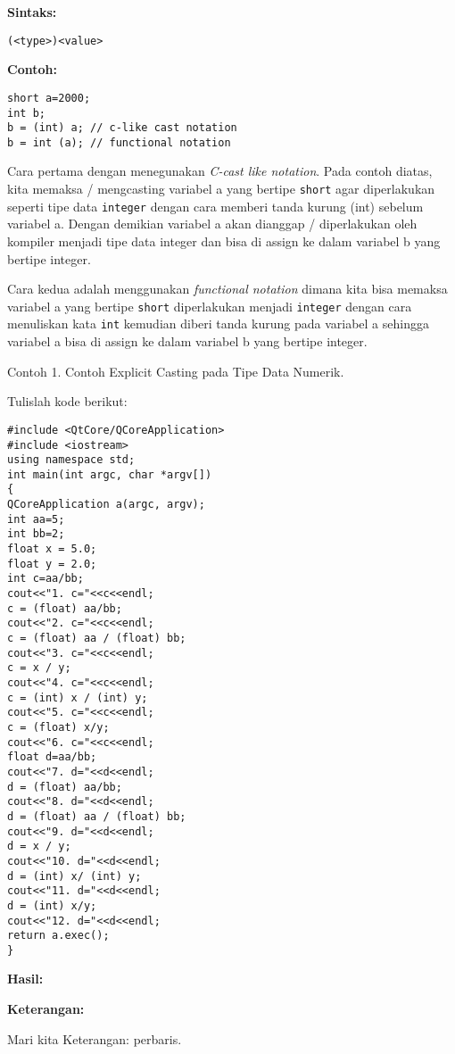 \textbf{Sintaks:}

\begin{verbatim}
(<type>)<value>
\end{verbatim}

\textbf{Contoh:}

\begin{verbatim}
short a=2000;
int b;
b = (int) a; // c-like cast notation
b = int (a); // functional notation
\end{verbatim}

Cara pertama dengan menegunakan \emph{C-cast like notation}. Pada contoh
diatas, kita memaksa / mengcasting variabel a yang bertipe
\texttt{short} agar diperlakukan seperti tipe data \texttt{integer}
dengan cara memberi tanda kurung (int) sebelum variabel a. Dengan
demikian variabel a akan dianggap / diperlakukan oleh kompiler menjadi
tipe data integer dan bisa di assign ke dalam variabel b yang bertipe
integer.

Cara kedua adalah menggunakan \emph{functional notation} dimana kita
bisa memaksa variabel a yang bertipe \texttt{short} diperlakukan menjadi
\texttt{integer} dengan cara menuliskan kata \texttt{int} kemudian
diberi tanda kurung pada variabel a sehingga variabel a bisa di assign
ke dalam variabel b yang bertipe integer.

Contoh 1. Contoh Explicit Casting pada Tipe Data Numerik.

Tulislah kode berikut:

\begin{verbatim}
#include <QtCore/QCoreApplication>
#include <iostream>
using namespace std;
int main(int argc, char *argv[])
{
QCoreApplication a(argc, argv);
int aa=5;
int bb=2;
float x = 5.0;
float y = 2.0;
int c=aa/bb;
cout<<"1. c="<<c<<endl;
c = (float) aa/bb;
cout<<"2. c="<<c<<endl;
c = (float) aa / (float) bb;
cout<<"3. c="<<c<<endl;
c = x / y;
cout<<"4. c="<<c<<endl;
c = (int) x / (int) y;
cout<<"5. c="<<c<<endl;
c = (float) x/y;
cout<<"6. c="<<c<<endl;
float d=aa/bb;
cout<<"7. d="<<d<<endl;
d = (float) aa/bb;
cout<<"8. d="<<d<<endl;
d = (float) aa / (float) bb;
cout<<"9. d="<<d<<endl;
d = x / y;
cout<<"10. d="<<d<<endl;
d = (int) x/ (int) y;
cout<<"11. d="<<d<<endl;
d = (int) x/y;
cout<<"12. d="<<d<<endl;
return a.exec();
}
\end{verbatim}

\textbf{Hasil:}

\textbf{Keterangan:}

Mari kita Keterangan: perbaris.

